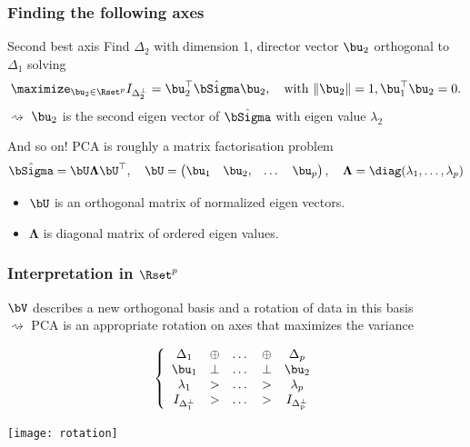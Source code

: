 \documentclass{beamer}\usepackage[]{graphicx}\usepackage[]{color}
\begin{document}
\begin{frame}
  \frametitle{Finding the following axes}

  \begin{block}{Second best axis}
    Find $\Delta_2$ with dimension 1, director vector $\bu_2$ orthogonal to $\Delta_1$ solving
    \begin{equation*}
        \maximize_{\bu_2 \in \Rset^p} I_{\Delta_2^\bot} = \bu_2^\top \hat{\bSigma}\bu_2, \quad \text{with } \|\bu_2\| = 1, \bu_1^\top \bu_2 = 0.
    \end{equation*} 
  $\rightsquigarrow$ $\bu_2$ is the second eigen vector of $\hat\bSigma$ with eigen value $\lambda_2$
  \end{block}
  
  \vfill
  \pause
  
  \begin{block}{And so on!}
    PCA is roughly a matrix factorisation problem 
    \begin{equation*}
      \hat\bSigma = \bU \boldsymbol\Lambda \bU^\top, \quad
      \bU = \begin{pmatrix}
      \bu_1 & \bu_2, & \dots & \bu_p
      \end{pmatrix}, \quad \boldsymbol\Lambda = \diag(\lambda_1, \dots, \lambda_p)
    \end{equation*}
    \hspace{-.5cm}
  \begin{itemize}
    \item $\bU$ is an orthogonal matrix of normalized eigen vectors.
    \item $\boldsymbol\Lambda$ is diagonal matrix of  ordered eigen values.
  \end{itemize}
  \end{block}
\end{frame}

\begin{frame}
  \frametitle{Interpretation in $\Rset^p$}
    
  $\bV$ describes a new orthogonal basis and a rotation of data in this basis\\
  $\rightsquigarrow$ PCA is an appropriate rotation on axes that maximizes the variance

  \begin{equation*}
    \left\{\begin{array}{ccccc}
      \Delta_1 & \oplus & \dots & \oplus & \Delta_p \\
      \bu_1 & \bot & \dots & \bot & \bu_2 \\
      \lambda_1 & > & \dots & > & \lambda_p \\
      I_{\Delta_1^\bot} & > & \dots & > & I_{\Delta_p^\bot} \\
    \end{array}\right.
  \end{equation*}

  \texttt{[image: rotation]}
\end{frame}
\end{document}
